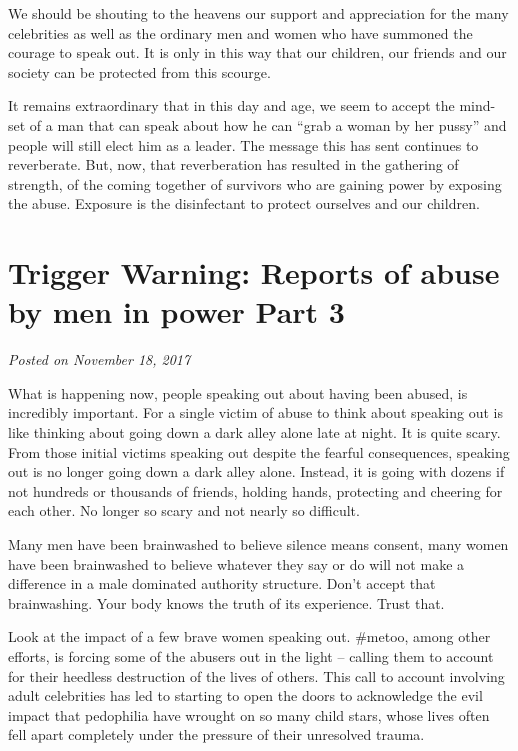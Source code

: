 \documentclass[]{book}
\begin{document}
We should be shouting to the heavens our support and appreciation for the many celebrities as well as the ordinary men and women who have summoned the courage to speak out. It is only in this way that our children, our friends and our society can be protected from this scourge.

It remains extraordinary that in this day and age, we seem to accept the mind-set of a man that can speak about how he can ``grab a woman by her pussy'' and people will still elect him as a leader. The message this has sent continues to reverberate. But, now, that reverberation has resulted in the gathering of strength, of the coming together of survivors who are gaining power by exposing the abuse. Exposure is the disinfectant to protect ourselves and our children.

\hypertarget{trigger-warning-reports-of-abuse-by-men-in-power-part-3}{%
\section{Trigger Warning: Reports of abuse by men in power Part 3}\label{trigger-warning-reports-of-abuse-by-men-in-power-part-3}}

\emph{Posted on November 18, 2017}

What is happening now, people speaking out about having been abused, is incredibly important. For a single victim of abuse to think about speaking out is like thinking about going down a dark alley alone late at night. It is quite scary. From those initial victims speaking out despite the fearful consequences, speaking out is no longer going down a dark alley alone. Instead, it is going with dozens if not hundreds or thousands of friends, holding hands, protecting and cheering for each other. No longer so scary and not nearly so difficult.

Many men have been brainwashed to believe silence means consent, many women have been brainwashed to believe whatever they say or do will not make a difference in a male dominated authority structure. Don't accept that brainwashing. Your body knows the truth of its experience. Trust that.

Look at the impact of a few brave women speaking out. \#metoo, among other efforts, is forcing some of the abusers out in the light -- calling them to account for their heedless destruction of the lives of others. This call to account involving adult celebrities has led to starting to open the doors to acknowledge the evil impact that pedophilia have wrought on so many child stars, whose lives often fell apart completely under the pressure of their unresolved trauma.
\end{document}
